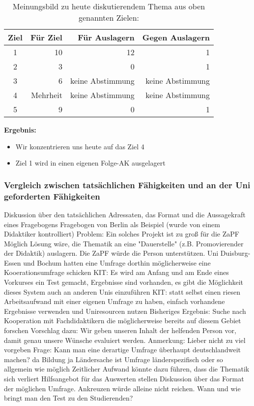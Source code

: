 			\begin{table}[h]
			\caption*{Meinungsbild zu heute diskutierendem Thema aus oben genannten Zielen:}
			\vspace{1em}

			\centering
				\begin{tabular}{c|r|r|r}
					Ziel & Für Ziel	& Für Auslagern	& Gegen Auslagern  \\ \hline
					1 &	10 & 12	& 1 \\
					2	& 3	& 0	& 1 \\
					3	& 6	& keine Abstimmung & keine Abstimmung \\
					4 &	Mehrheit & keine Abstimmung &	keine Abstimmung \\
					5 &	9	& 0	& 1
				\end{tabular}
		\end{table}
		
				\textbf{Ergebnis:}
				\begin{itemize}
					\item Wir konzentrieren uns heute auf das Ziel 4
					\item Ziel 1 wird in einen eigenen Folge-AK ausgelagert
				\end{itemize}

		\subsubsection*{Vergleich zwischen tatsächlichen Fähigkeiten und an der Uni geforderten Fähigkeiten}
			\begin{outline}
				\1 Diskussion über den tatsächlichen Adressaten, das Format und die Aussagekraft eines Fragebogens
				\1 Fragebogen von Berlin als Beispiel (wurde von einem Didaktiker kontrolliert)
				\1 Problem: Ein solches Projekt ist zu groß für die ZaPF
					\2 Möglich Lösung wäre, die Thematik an eine "Dauerstelle" (z.B. Promovierender der Didaktik) auslagern. Die ZaPF würde die Person unterstützen.
					\2 Uni Duisburg-Essen und Bochum hatten eine Umfrage dorthin möglicherweise eine Kooerationsumfrage schicken
					\2 KIT: Es wird am Anfang und am Ende eines Vorkurses ein Test gemacht, Ergebnisse sind vorhanden, es gibt die Möglichkeit dieses System auch an anderen Unis einzuführen
					\2 KIT: statt selbst einen riesen Arbeitsaufwand mit einer eigenen Umfrage zu haben, einfach vorhandene Ergebnisse verwenden und Uniresourcen nutzen
					\2 Bisheriges Ergebnis: Suche nach Kooperation mit Fachdidaktikern die möglicherweise bereits auf diesem Gebiet forschen
					\2 Vorschlag dazu: Wir geben unseren Inhalt der helfenden Person vor, damit genau unsere Wünsche evaluiert werden.
						\3 Anmerkung: Lieber nicht zu viel vorgeben
				\1 Frage: Kann man eine derartige Umfrage überhaupt deutschlandweit machen? da Bildung ja Ländersache ist
					\2 Umfrage länderspezifisch oder so allgemein wie möglich
					\2 Zeitlicher Aufwand könnte dazu führen, dass die Thematik sich verliert
				\1 Hilfsangebot für das Auswerten stellen
				\1 Diskussion über das Format der möglichen Umfrage. Ankreuzen würde alleine nicht reichen.
				\1 Wann und wie bringt man den Test zu den Studierenden?
			\end{outline}

